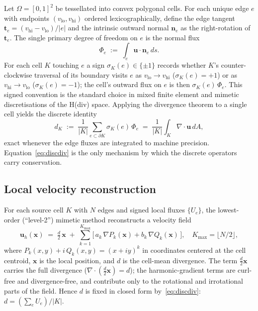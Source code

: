 \documentclass[10pt]{article}
\newcommand{\uh}{\mathbf{u}_h}
\newcommand{\uvec}{\mathbf{u}}
\newcommand{\nv}{\mathbf{n}}
\newcommand{\xv}{\mathbf{x}}
\begin{document}
Let $\Omega = [0,1]^2$ be tessellated into convex polygonal cells. For each unique edge $e$ with endpoints $(v_{\text{lo}}, v_{\text{hi}})$ ordered lexicographically, define the edge tangent $\mathbf{t}_e = (v_{\text{hi}} - v_{\text{lo}})/|e|$ and the intrinsic outward normal $\nv_e$ as the right-rotation of $\mathbf{t}_e$. The single primary degree of freedom on $e$ is the normal flux
\begin{equation}
\Phi_e \;:=\; \int_{e} \uvec\cdot\nv_e\,ds.
\label{eq:dof}
\end{equation}
For each cell $K$ touching $e$ a sign $\sigma_K(e)\in\{\pm 1\}$ records whether $K$'s counter-clockwise traversal of its boundary visits $e$ as $v_{\text{lo}}\!\to\!v_{\text{hi}}$ ($\sigma_K(e)=+1$) or as $v_{\text{hi}}\!\to\!v_{\text{lo}}$ ($\sigma_K(e)=-1$); the cell's outward flux on $e$ is then $\sigma_K(e)\,\Phi_e$. This signed convention is the standard choice in mixed finite element \cite{RaviartThomas1977,BrezziFortin1991} and mimetic \cite{BochevHyman2006,LipnikovManziniShashkov2014} discretisations of the H(div) space. Applying the divergence theorem to a single cell yields the discrete identity
\begin{equation}
d_K \;:=\; \frac{1}{|K|}\sum_{e\subset\partial K} \sigma_K(e)\,\Phi_e
       \;=\; \frac{1}{|K|}\!\int_K \nabla\!\cdot\!\uvec\,dA,
\label{eq:discdiv}
\end{equation}
exact whenever the edge fluxes are integrated to machine precision. Equation~\eqref{eq:discdiv} is the only mechanism by which the discrete operators carry conservation.

\subsection{Local velocity reconstruction}

For each source cell $K$ with $N$ edges and signed local fluxes $\{U_e\}$, the lowest-order (``level-2'') mimetic method \cite{PerotChartrand2021} reconstructs a velocity field
\begin{equation}
\uh(\xv) \;=\; \tfrac{d}{2}\,\xv \;+\; \sum_{k=1}^{K_{\max}}\!\bigl[\,a_k\,\nabla P_k(\xv) + b_k\,\nabla Q_k(\xv)\,\bigr],\quad K_{\max} = \lfloor N/2\rfloor,
\label{eq:reconform}
\end{equation}
where $P_k(x,y) + i\,Q_k(x,y) = (x+iy)^k$ in coordinates centered at the cell centroid, $\xv$ is the local position, and $d$ is the cell-mean divergence. The term $\tfrac{d}{2}\xv$ carries the full divergence ($\nabla\!\cdot\!(\tfrac{d}{2}\xv) = d$); the harmonic-gradient terms are curl-free and divergence-free, and contribute only to the rotational and irrotational parts of the field. Hence $d$ is fixed in closed form by~\eqref{eq:discdiv}: $d = (\sum_e U_e)/|K|$.
\end{document}
